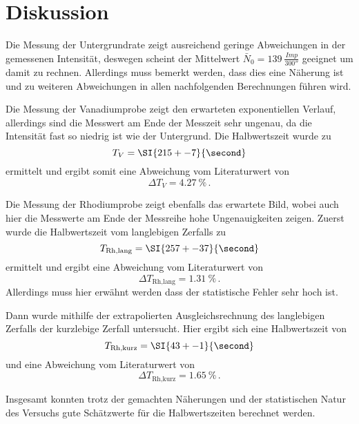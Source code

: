 \section{Diskussion}
\label{sec:Diskussion}

Die Messung der Untergrundrate zeigt ausreichend geringe Abweichungen in der gemessenen Intensität, deswegen scheint der Mittelwert $\bar{N}_0 = \SI{139}{\frac{Imp}{300\second}}$ geeignet um damit zu rechnen.
Allerdings muss bemerkt werden, dass dies eine Näherung ist und zu weiteren Abweichungen in allen nachfolgenden Berechnungen führen wird.

Die Messung der Vanadiumprobe zeigt den erwarteten exponentiellen Verlauf, allerdings sind die Messwert am Ende der Messzeit sehr ungenau, da die Intensität fast so niedrig ist wie der Untergrund.
Die Halbwertszeit wurde zu
\begin{equation*}
    T_V = \SI{215+-7}{\second}
\end{equation*}
ermittelt und ergibt somit eine Abweichung vom Literaturwert von
\begin{equation*}
    \Delta T_V = \SI{4.27}{\percent} \, .
\end{equation*}

Die Messung der Rhodiumprobe zeigt ebenfalls das erwartete Bild, wobei auch hier die Messwerte am Ende der Messreihe hohe Ungenauigkeiten zeigen.
Zuerst wurde die Halbwertszeit vom langlebigen Zerfalls zu
\begin{equation*}
    T_\text{Rh,lang} = \SI{257+-37}{\second}
\end{equation*}
ermittelt und ergibt eine Abweichung vom Literaturwert von 
\begin{equation*}
    \Delta T_\text{Rh,lang} = \SI{1.31}{\percent} \, .
\end{equation*}
Allerdings muss hier erwähnt werden dass der statistische Fehler sehr hoch ist.

Dann wurde mithilfe der extrapolierten Ausgleichsrechnung des langlebigen Zerfalls der kurzlebige Zerfall untersucht.
Hier ergibt sich eine Halbwertszeit von
\begin{equation*}
    T_\text{Rh,kurz} = \SI{43+-1}{\second}
\end{equation*}
und eine Abweichung vom Literaturwert von 
\begin{equation*}
    \Delta T_\text{Rh,kurz} = \SI{1.65}{\percent} \, .
\end{equation*}

Insgesamt konnten trotz der gemachten Näherungen und der statistischen Natur des Versuchs gute Schätzwerte für die Halbwertszeiten berechnet werden.